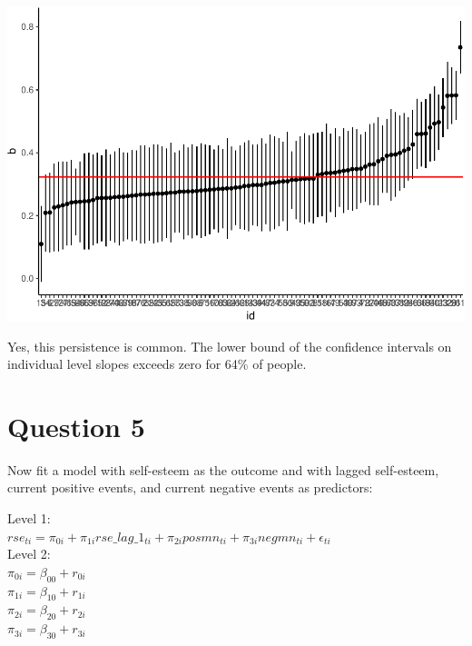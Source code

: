 \documentclass[]{article}
\newenvironment{Shaded}{\begin{snugshade}}{\end{snugshade}}
\newcommand{\KeywordTok}[1]{\textcolor[rgb]{0.13,0.29,0.53}{\textbf{#1}}}
\newcommand{\DataTypeTok}[1]{\textcolor[rgb]{0.13,0.29,0.53}{#1}}
\newcommand{\FloatTok}[1]{\textcolor[rgb]{0.00,0.00,0.81}{#1}}
\newcommand{\StringTok}[1]{\textcolor[rgb]{0.31,0.60,0.02}{#1}}
\newcommand{\OperatorTok}[1]{\textcolor[rgb]{0.81,0.36,0.00}{\textbf{#1}}}
\newcommand{\NormalTok}[1]{#1}
\begin{document}
\includegraphics{Beck_HW_7_R_1_files/figure-latex/unnamed-chunk-8-1.pdf}

\begin{Shaded}
\end{Shaded}

Yes, this persistence is common. The lower bound of the confidence
intervals on individual level slopes exceeds zero for 64\% of people.

\section{Question 5}\label{question-5}

Now fit a model with self-esteem as the outcome and with lagged
self-esteem, current positive events, and current negative events as
predictors:

Level 1:\\
\(rse_{ti} = \pi_{0i} + \pi_{1i}rse\_lag\_1_{ti} + \pi_{2i}posmn_{ti} + \pi_{3i}negmn_{ti} + \epsilon_{ti}\)\\
Level 2:\\
\(\pi_{0i} = \beta_{00} + r_{0i}\)\\
\(\pi_{1i} = \beta_{10} + r_{1i}\)\\
\(\pi_{2i} = \beta_{20} + r_{2i}\)\\
\(\pi_{3i} = \beta_{30} + r_{3i}\)
\end{document}
